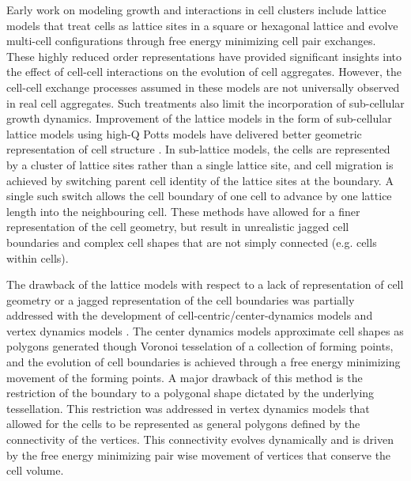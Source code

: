 \documentclass{article}
\begin{document}
Early work on modeling growth and interactions in cell clusters include lattice models \cite{GOEL1970423, GOEL1978103, Mochizuk1998} that treat cells as lattice sites in a square or hexagonal lattice and evolve multi-cell configurations through free energy minimizing cell pair exchanges. These highly reduced order representations have provided significant insights into the effect of cell-cell interactions on the evolution of cell aggregates. However, the cell-cell exchange processes assumed in these models are not universally observed in real cell aggregates. Such treatments also limit the incorporation of sub-cellular growth dynamics. Improvement of the lattice models in the form of sub-cellular lattice models using high-Q Potts models have delivered better geometric representation of cell structure \cite{Glazier1992, Glazier1993}. In sub-lattice models, the cells are represented by a cluster of lattice sites rather than a single lattice site, and cell migration is achieved by switching parent cell identity of the lattice sites at the boundary. A single such switch allows the  
cell boundary of one cell to advance by one lattice length into the neighbouring cell. These methods have allowed for a finer representation of the cell geometry, but result in unrealistic jagged cell boundaries and complex cell shapes that are not simply connected (e.g. cells within cells). 

The drawback of the lattice models with respect to a lack of representation of cell geometry or a jagged representation of the cell boundaries was partially addressed with the development of cell-centric/center-dynamics models \cite{HONDA1978523, HONDA1983191, GRANER1993455, Mosaffa2015} and vertex dynamics models \cite{HONDA1983191, Honda1986, FLETCHER20142291, Silvanus2017, Munoz2017}. The center dynamics models approximate cell shapes as polygons generated though Voronoi tesselation of a collection of forming points, and the evolution of cell boundaries is achieved through a free energy minimizing movement of the forming points. A major drawback of this method is the restriction of the boundary to a polygonal shape dictated by the underlying tessellation. This restriction was addressed in vertex dynamics models that allowed for the cells to be represented as general polygons defined by the connectivity of the vertices. This connectivity evolves dynamically and is driven by the free energy minimizing pair wise movement of vertices that conserve the cell volume. 
\end{document}

